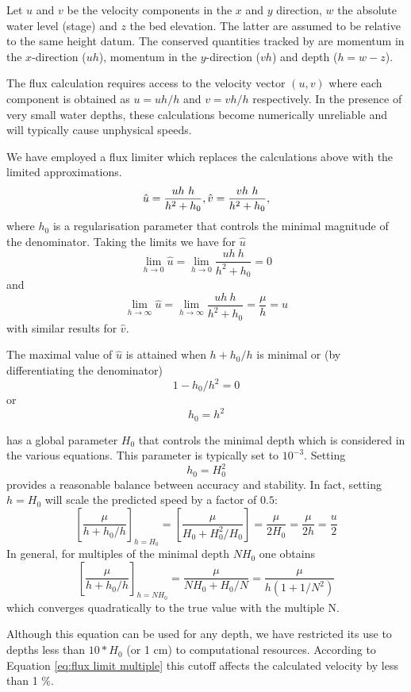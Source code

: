 \documentclass{manual}
\begin{document}
Let $u$ and $v$ be the velocity components in the $x$ and $y$ direction,
$w$ the absolute water level (stage) and
$z$ the bed elevation. The latter are assumed to be relative to the
same height datum.
The conserved quantities tracked by \anuga are momentum in the
$x$-direction ($uh$), momentum in the $y$-direction ($vh$)
and depth ($h = w-z$).

The flux calculation requires access to the velocity vector $(u, v)$
where each component is obtained as $u = uh/h$ and $v = vh/h$ respectively.
In the presence of very small water depths, these calculations become
numerically unreliable and will typically cause unphysical speeds.

We have employed a flux limiter which replaces the calculations above with
the limited approximations.
\begin{equation}
  \hat{u} = \frac{uh\ h}{h^2 + h_0}, \bigskip \hat{v} = \frac{vh\ h}{h^2 + h_0},
\end{equation}
where $h_0$ is a regularisation parameter that controls the minimal
magnitude of the denominator. Taking the limits we have for $\hat{u}$
\[
  \lim_{h \rightarrow 0} \hat{u} =
  \lim_{h \rightarrow 0} \frac{uh\ h}{h^2 + h_0} = 0
\]
and
\[
  \lim_{h \rightarrow \infty} \hat{u} =
  \lim_{h \rightarrow \infty} \frac{uh\ h}{h^2 + h_0} = \frac{\mu}{h} = u
\]
with similar results for $\hat{v}$.

The maximal value of $\hat{u}$ is attained when $h+h_0/h$ is minimal or (by differentiating the denominator)
\[
  1 - h_0/h^2 = 0
\]
or
\[
  h_0 = h^2
\]

\anuga has a global parameter $H_0$ that controls the minimal depth which
is considered in the various equations. This parameter is typically set to
$10^{-3}$. Setting
\[
  h_0 = H_0^2
\]
provides a reasonable balance between accuracy and stability. In fact,
setting $h=H_0$ will scale the predicted speed by a factor of $0.5$:
\[
  \left[ \frac{\mu}{h + h_0/h} \right]_{h = H_0} =
  \left[ \frac{\mu}{H_0 + H_0^2/H_0} \right] =
  \frac{\mu}{2 H_0} = \frac{\mu}{2 h} = \frac{u}{2}
\]
In general, for multiples of the minimal depth $N H_0$ one obtains
\begin{equation}
  \left[ \frac{\mu}{h + h_0/h} \right]_{h = N H_0} =
  \frac{\mu}{N H_0 + H_0/N} =
  \frac{\mu}{h (1 + 1/N^2)}
  \label{eq:flux limit multiple}
\end{equation}
which converges quadratically to the true value with the multiple N.

Although this equation can be used for any depth, we have restricted its use to depths less than $10 * H_0$ (or 1 cm) to computational resources.
According to Equation \ref{eq:flux limit multiple} this cutoff
affects the calculated velocity by less than 1 \%.
\end{document}
